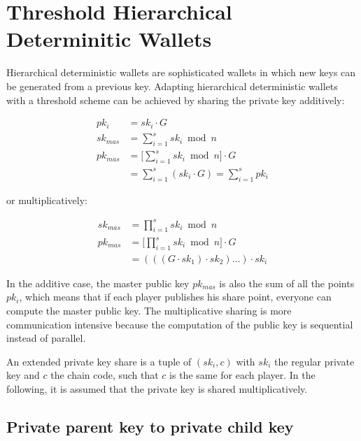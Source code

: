 \section{Threshold Hierarchical Determinitic Wallets}

Hierarchical deterministic wallets are sophisticated wallets in which new keys
can be generated from a previous key. Adapting hierarchical deterministic
wallets with a threshold scheme can be achieved by sharing the private key
additively:

\begin{equation*}
\begin{split}
  pk_i     &= sk_i \cdot G \\
  sk_{mas} &= \sum_{i=1}^{s} sk_i \bmod n \\
  pk_{mas} &= \Bigg[ \sum_{i=1}^{s} sk_i \bmod n \Bigg] \cdot G \\
           &= \sum_{i=1}^{s} (sk_i \cdot G) = \sum_{i=1}^{s} pk_i
\end{split}
\end{equation*}

or multiplicatively:

\begin{equation*}
\begin{split}
  sk_{mas} &= \prod_{i=1}^{s} sk_i \bmod n \\
  pk_{mas} &= \Bigg[ \prod_{i=1}^{s} sk_i \bmod n \Bigg] \cdot G \\
           &= (((G \cdot sk_1) \cdot sk_2) \dots )\cdot sk_i
\end{split}
\end{equation*}

In the additive case, the master public key $pk_{mas}$ is also the sum of all
the points $pk_i$, which means that if each player publishes his share point,
everyone can compute the master public key. The multiplicative sharing is more
communication intensive because the computation of the public key is sequential
instead of parallel.

An extended private key share is a tuple of $(sk_i, c)$ with $sk_i$ the regular
private key and $c$ the chain code, such that $c$ is the same for each player.
In the following, it is assumed that the private key is shared multiplicatively.

\subsection{Private parent key to private child key}

